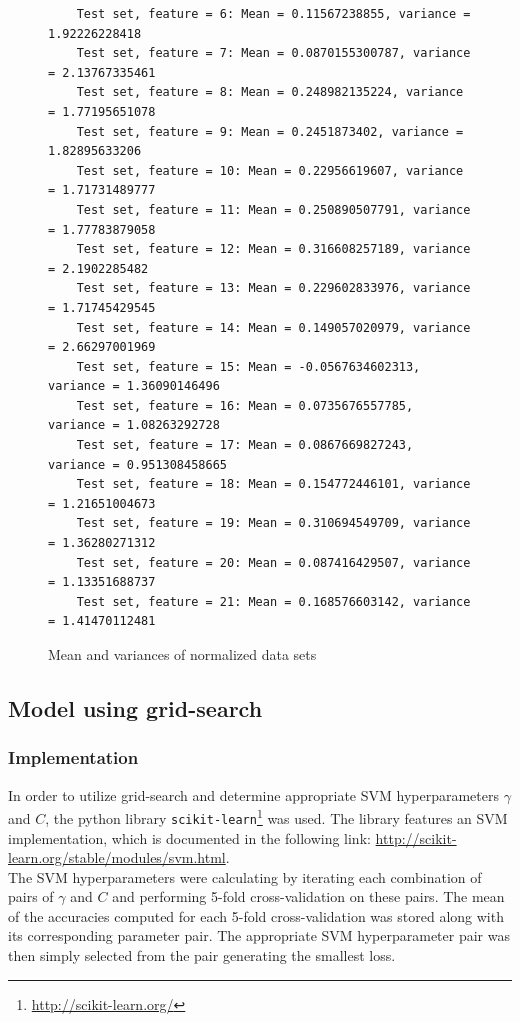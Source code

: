 \documentclass[a4paper]{article}
\begin{document}
\begin{figure}[H]
\begin{lstlisting}
	Test set, feature = 6: Mean = 0.11567238855, variance = 1.92226228418
	Test set, feature = 7: Mean = 0.0870155300787, variance = 2.13767335461
	Test set, feature = 8: Mean = 0.248982135224, variance = 1.77195651078	
	Test set, feature = 9: Mean = 0.2451873402, variance = 1.82895633206
	Test set, feature = 10: Mean = 0.22956619607, variance = 1.71731489777
	Test set, feature = 11: Mean = 0.250890507791, variance = 1.77783879058
	Test set, feature = 12: Mean = 0.316608257189, variance = 2.1902285482
	Test set, feature = 13: Mean = 0.229602833976, variance = 1.71745429545
	Test set, feature = 14: Mean = 0.149057020979, variance = 2.66297001969
	Test set, feature = 15: Mean = -0.0567634602313, variance = 1.36090146496
	Test set, feature = 16: Mean = 0.0735676557785, variance = 1.08263292728
	Test set, feature = 17: Mean = 0.0867669827243, variance = 0.951308458665
	Test set, feature = 18: Mean = 0.154772446101, variance = 1.21651004673
	Test set, feature = 19: Mean = 0.310694549709, variance = 1.36280271312
	Test set, feature = 20: Mean = 0.087416429507, variance = 1.13351688737
	Test set, feature = 21: Mean = 0.168576603142, variance = 1.41470112481
	\end{lstlisting}
	\caption{Mean and variances of normalized data sets}
	\label{fig:mean_variance_data}
\end{figure}

\subsection{Model using grid-search}
\subsubsection{Implementation}
In order to utilize grid-search and determine appropriate SVM hyperparameters $\gamma$ and $C$, the python library \texttt{scikit-learn}\footnote{\url{http://scikit-learn.org/}} was used. The library features an SVM implementation, which is documented in the following link: \url{http://scikit-learn.org/stable/modules/svm.html}.\\

The SVM hyperparameters were calculating by iterating each combination of pairs of $\gamma$ and $C$ and performing 5-fold cross-validation on these pairs. The mean of the accuracies computed for each 5-fold cross-validation was stored along with its corresponding parameter pair. The appropriate SVM hyperparameter pair was then simply selected from the pair generating the smallest loss.
\end{document}
